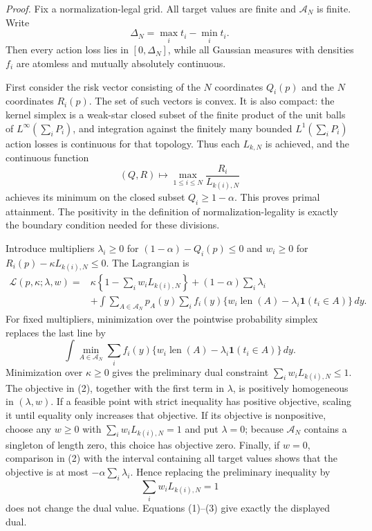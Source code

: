 \textit{Proof.}
Fix a normalization-legal grid.  All target values are finite and \(\mathcal A_N\) is finite.  Write
\[
 \Delta_N=\max_i t_i-\min_i t_i.
\]
Then every action loss lies in \([0,\Delta_N]\), while all Gaussian measures with densities \(f_i\) are atomless and mutually absolutely continuous.

First consider the risk vector consisting of the \(N\) coordinates \(Q_i(p)\) and the \(N\) coordinates \(R_i(p)\).  The set of such vectors is convex.  It is also compact: the kernel simplex is a weak-star closed subset of the finite product of the unit balls of \(L^\infty(\sum_iP_i)\), and integration against the finitely many bounded \(L^1(\sum_iP_i)\) action losses is continuous for that topology.  Thus each \(L_{k,N}\) is achieved, and the continuous function
\[
 (Q,R)\longmapsto\max_{1\leq i\leq N}\frac{R_i}{L_{k(i),N}}
\]
achieves its minimum on the closed subset \(Q_i\geq1-\alpha\).  This proves primal attainment.  The positivity in the definition of normalization-legality is exactly the boundary condition needed for these divisions.

Introduce multipliers \(\lambda_i\geq0\) for
\((1-\alpha)-Q_i(p)\leq0\) and \(w_i\geq0\) for
\(R_i(p)-\kappa L_{k(i),N}\leq0\).  The Lagrangian is
\[
\begin{split}
 \mathcal L(p,\kappa;\lambda,w)
 ={}&\kappa\left\{1-\sum_iw_iL_{k(i),N}\right\}
 +(1-\alpha)\sum_i\lambda_i\\
 &+\int\sum_{A\in\mathcal A_N}p_A(y)
 \sum_i f_i(y)\{w_i\operatorname{len}(A)-\lambda_i\mathbf1(t_i\in A)\}\,dy.
\end{split}
\tag{1}
\]
For fixed multipliers, minimization over the pointwise probability simplex replaces the last line by
\[
 \int\min_{A\in\mathcal A_N}\sum_i f_i(y)
 \{w_i\operatorname{len}(A)-\lambda_i\mathbf1(t_i\in A)\}\,dy.
\tag{2}
\]
Minimization over \(\kappa\geq0\) gives the preliminary dual constraint
\(\sum_iw_iL_{k(i),N}\leq1\).  The objective in (2), together with the first term in \(\lambda\), is positively homogeneous in \((\lambda,w)\).  If a feasible point with strict inequality has positive objective, scaling it until equality only increases that objective.  If its objective is nonpositive, choose any \(w\geq0\) with \(\sum_iw_iL_{k(i),N}=1\) and put \(\lambda=0\); because \(\mathcal A_N\) contains a singleton of length zero, this choice has objective zero.  Finally, if \(w=0\), comparison in (2) with the interval containing all target values shows that the objective is at most \(-\alpha\sum_i\lambda_i\).  Hence replacing the preliminary inequality by
\[
 \sum_iw_iL_{k(i),N}=1
\tag{3}
\]
does not change the dual value.  Equations (1)--(3) give exactly the displayed dual.

